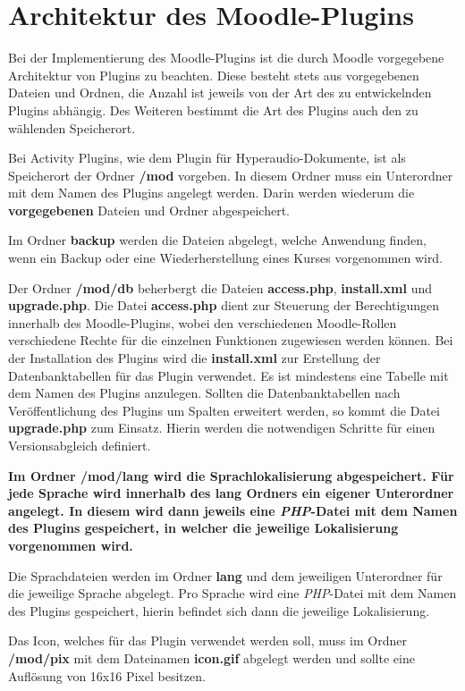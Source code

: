 \section{Architektur des Moodle-Plugins}
Bei der Implementierung des Moodle-Plugins ist die durch Moodle vorgegebene Architektur von Plugins zu beachten. Diese besteht stets aus vorgegebenen Dateien und Ordnen, die Anzahl ist jeweils von der Art des zu entwickelnden Plugins abhängig. Des Weiteren bestimmt die Art des Plugins auch den zu wählenden Speicherort.

Bei Activity Plugins, wie dem Plugin für Hyperaudio-Dokumente, ist als Speicherort der Ordner \textbf{/mod} vorgeben. In diesem Ordner muss ein Unterordner mit dem Namen des Plugins angelegt werden. Darin werden wiederum die \textbf{vorgegebenen} Dateien und Ordner abgespeichert.

Im Ordner \textbf{backup} werden die Dateien abgelegt, welche Anwendung finden, wenn ein Backup oder eine Wiederherstellung eines Kurses vorgenommen wird.

Der Ordner \textbf{/mod/db} beherbergt die Dateien \textbf{access.php}, \textbf{install.xml} und \textbf{upgrade.php}. Die Datei \textbf{access.php} dient zur Steuerung der Berechtigungen innerhalb des Moodle-Plugins, wobei den verschiedenen Moodle-Rollen verschiedene Rechte für die einzelnen Funktionen zugewiesen werden können. Bei der Installation des Plugins wird die \textbf{install.xml} zur Erstellung der Datenbanktabellen für das Plugin verwendet. Es ist mindestens eine Tabelle mit dem Namen des Plugins anzulegen. Sollten die Datenbanktabellen nach Veröffentlichung des Plugins um Spalten erweitert werden, so kommt die Datei \textbf{upgrade.php} zum Einsatz. Hierin werden die notwendigen Schritte für einen Versionsabgleich definiert.

\textbf{Im Ordner \textbf{/mod/lang} wird die Sprachlokalisierung abgespeichert. Für jede Sprache wird innerhalb des \textbf{lang} Ordners ein eigener Unterordner angelegt. In diesem wird dann jeweils eine \textit{PHP}-Datei mit dem Namen des Plugins gespeichert, in welcher die jeweilige Lokalisierung vorgenommen wird.}

Die Sprachdateien werden im Ordner \textbf{lang} und dem jeweiligen Unterordner für die jeweilige Sprache abgelegt. Pro Sprache wird eine \textit{PHP}-Datei mit dem Namen des Plugins gespeichert, hierin befindet sich dann die jeweilige Lokalisierung.

Das Icon, welches für das Plugin  verwendet werden soll, muss im Ordner \textbf{/mod/pix} mit dem Dateinamen \textbf{icon.gif} abgelegt werden und sollte eine Auflösung von 16x16 Pixel besitzen.

